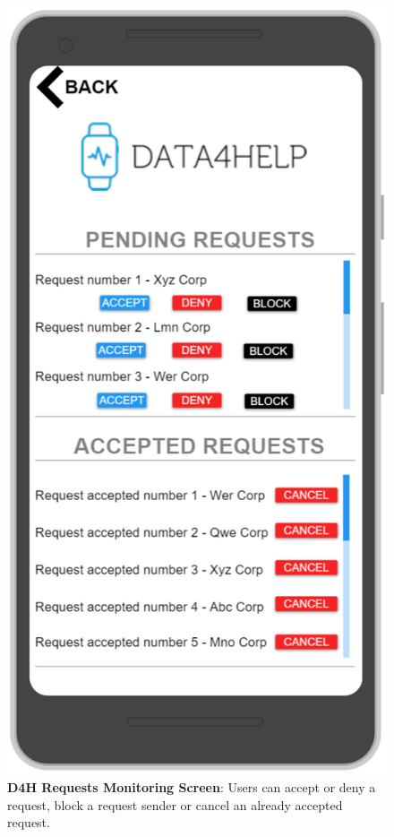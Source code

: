 \begin{figure}[H]
\centering
\includegraphics[scale = 0.5]{Mocks/Mobile_D4H_Requests.PNG}
\caption{\textbf{D4H Requests Monitoring Screen}: Users can accept or deny a request, block a request sender or cancel an already accepted request.}
\end{figure}

